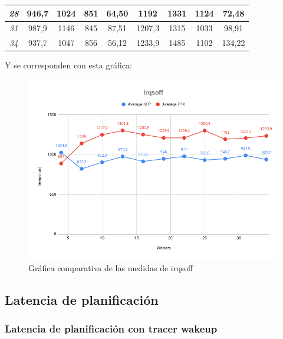 \documentclass[../main.tex]{subfiles}
\begin{document}
\begin{table}[htp]
\begin{tabular}{|c|c|c|c|c|c|c|c|c|}
\textit{28}                          & 946,7        & 1024         & 851          & 64,50            & 1192         & 1331         & 1124         & 72,48            \\ \hline
\textit{31}                          & 987,9        & 1146         & 845          & 87,51            & 1207,3       & 1315         & 1033         & 98,91            \\ \hline
\textit{34}                          & 937,7        & 1047         & 856          & 56,12            & 1233,9       & 1485         & 1102         & 134,22           \\ \hline
\end{tabular}
\end{table}

Y se corresponden con esta gráfica:

\begin{figure}[htp]
    \centering
    \includegraphics[width=15cm]{imagenes/graficas/Irqsoff.png}
    \caption{Gráfica comparativa de las medidas de irqsoff}
\end{figure}

\subsection{Latencia de planificación}

\subsubsection{Latencia de planificación con tracer wakeup}
\end{document}
